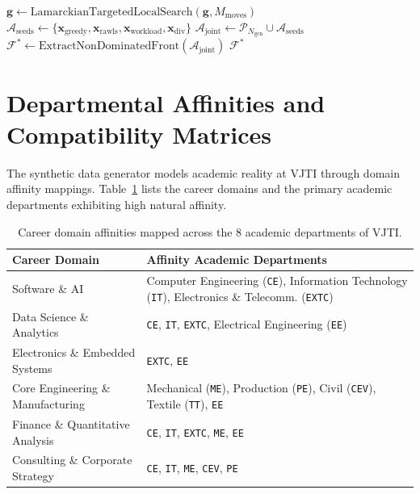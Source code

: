 \begin{algorithm}[htbp]
\begin{algorithmic}[1]
            \State $\mathbf{g} \gets \text{LamarckianTargetedLocalSearch}(\mathbf{g}, M_{\text{moves}})$
        \EndIf
    \EndFor
\EndFor
\State $\mathcal{A}_{\text{seeds}} \gets \{\mathbf{x}_{\text{greedy}}, \mathbf{x}_{\text{rawls}}, \mathbf{x}_{\text{workload}}, \mathbf{x}_{\text{div}}\}$
\State $\mathcal{A}_{\text{joint}} \gets \mathcal{P}_{N_{\text{gen}}} \cup \mathcal{A}_{\text{seeds}}$
\State $\mathcal{F}^* \gets \text{ExtractNonDominatedFront}(\mathcal{A}_{\text{joint}})$
\State \Return $\mathcal{F}^*$
\end{algorithmic}
\end{algorithm}

\section{Departmental Affinities and Compatibility Matrices}
The synthetic data generator models academic reality at VJTI through domain affinity mappings. Table~\ref{tab:domain_affinities} lists the career domains and the primary academic departments exhibiting high natural affinity.

\begin{table}[htbp]
\centering
\caption{Career domain affinities mapped across the 8 academic departments of VJTI.}
\label{tab:domain_affinities}
\begin{tabularx}{\textwidth}{lX}
\toprule
\textbf{Career Domain} & \textbf{Affinity Academic Departments} \\
\midrule
Software \& AI & Computer Engineering (\texttt{CE}), Information Technology (\texttt{IT}), Electronics \& Telecomm. (\texttt{EXTC}) \\
Data Science \& Analytics & \texttt{CE}, \texttt{IT}, \texttt{EXTC}, Electrical Engineering (\texttt{EE}) \\
Electronics \& Embedded Systems & \texttt{EXTC}, \texttt{EE} \\
Core Engineering \& Manufacturing & Mechanical (\texttt{ME}), Production (\texttt{PE}), Civil (\texttt{CEV}), Textile (\texttt{TT}), \texttt{EE} \\
Finance \& Quantitative Analysis & \texttt{CE}, \texttt{IT}, \texttt{EXTC}, \texttt{ME}, \texttt{EE} \\
Consulting \& Corporate Strategy & \texttt{CE}, \texttt{IT}, \texttt{ME}, \texttt{CEV}, \texttt{PE} \\
\bottomrule
\end{tabularx}
\end{table}

